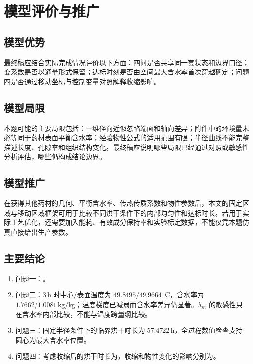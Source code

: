\section{模型评价与推广}

\subsection{模型优势}

最终稿应结合实际完成情况评价以下方面：四问是否共享同一套状态和边界口径；变系数是否以通量形式保留；达标时刻是否由空间最大含水率首次穿越确定；问题四是否通过移动坐标与控制变量对照解释收缩影响。


\subsection{模型局限}

本题可能的主要局限包括：一维径向近似忽略端面和轴向差异；附件中的环境量未必等同于药材表面平衡含水率；经验物性公式的适用范围有限；半径曲线不能完整描述长度、孔隙率和组织结构变化。最终稿应说明哪些局限已经通过对照或敏感性分析评估，哪些仍构成结论边界。

\subsection{模型推广}

在获得其他药材的几何、平衡含水率、传热传质系数和物性参数后，本文的固定区域与移动区域框架可用于比较不同烘干条件下的内部均匀性和达标时长。若用于实际工艺优化，还需要加入能耗、有效成分保持率和实验标定数据，不能仅凭本题仿真直接给出生产参数。

\subsection{主要结论}

\begin{enumerate}
  \item 问题一：。
  \item 问题二：$3\,\mathrm{h}$ 时中心/表面温度为 $49.8495/49.9664\,{}^\circ\mathrm{C}$，含水率为 $1.7662/1.0081\,\mathrm{kg/kg}$；温度梯度已减弱而含水率差异仍显著。$h_m$ 的敏感性只在含水率内部比较，不能与温度跨量纲比较。
  \item 问题三：固定半径条件下的临界烘干时长为 $57.4722\,\mathrm h$，全过程数值检查支持圆心为最大含水率位置。
  \item 问题四：考虑收缩后的烘干时长为，收缩和物性变化的影响分别为。
\end{enumerate}
